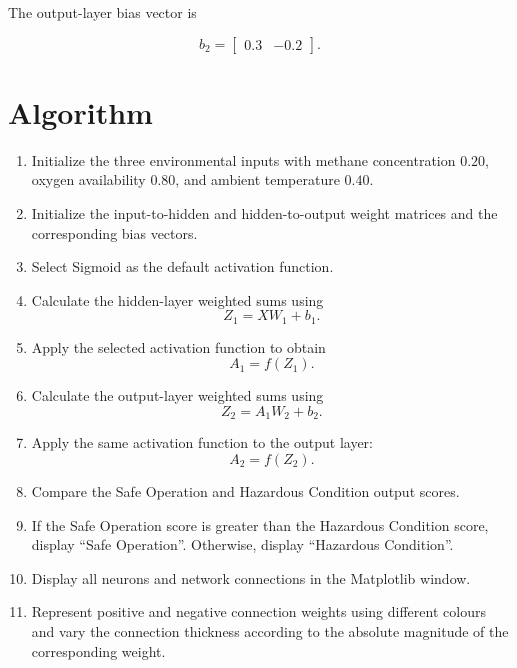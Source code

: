 \documentclass[12pt]{article}
\begin{document}
The output-layer bias vector is

\[
b_2 =
\begin{bmatrix}
0.3 & -0.2
\end{bmatrix}.
\]


\section{Algorithm}

\begin{enumerate}

    \item Initialize the three environmental inputs with methane
    concentration $0.20$, oxygen availability $0.80$, and ambient
    temperature $0.40$.

    \item Initialize the input-to-hidden and hidden-to-output weight
    matrices and the corresponding bias vectors.

    \item Select Sigmoid as the default activation function.

    \item Calculate the hidden-layer weighted sums using
    \[
    Z_1 = XW_1 + b_1.
    \]

    \item Apply the selected activation function to obtain
    \[
    A_1 = f(Z_1).
    \]

    \item Calculate the output-layer weighted sums using
    \[
    Z_2 = A_1W_2 + b_2.
    \]

    \item Apply the same activation function to the output layer:
    \[
    A_2 = f(Z_2).
    \]

    \item Compare the Safe Operation and Hazardous Condition output
    scores.

    \item If the Safe Operation score is greater than the Hazardous
    Condition score, display ``Safe Operation''. Otherwise, display
    ``Hazardous Condition''.

    \item Display all neurons and network connections in the
    Matplotlib window.

    \item Represent positive and negative connection weights using
    different colours and vary the connection thickness according
    to the absolute magnitude of the corresponding weight.


\end{enumerate}
\end{document}
